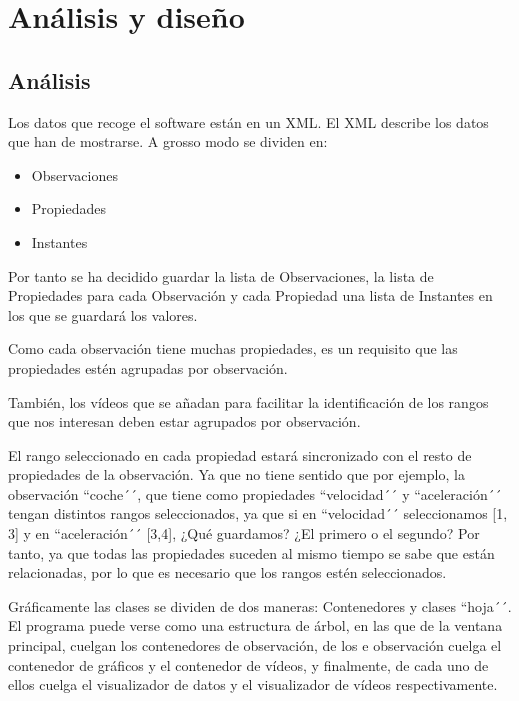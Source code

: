 \chapter{An\'{a}lisis y dise\~{n}o}


\section{An\'{a}lisis}
Los datos que recoge el software est\'an en un XML. El XML describe los datos que han de mostrarse. A grosso modo se dividen en:
\begin{itemize}
	\item Observaciones
	\item Propiedades
	\item Instantes
\end{itemize}

Por tanto se ha decidido guardar la lista de Observaciones, la lista de Propiedades para cada Observaci\'on y cada Propiedad
una lista de Instantes en los que se guardar\'a los valores.

Como cada observaci\'on tiene muchas propiedades, es un requisito que las propiedades est\'en
agrupadas por observaci\'on.

Tambi\'en, los v\'ideos que se a\~nadan para facilitar la identificaci\'on de los rangos que
nos interesan deben estar agrupados por observaci\'on.

El rango seleccionado en cada propiedad estar\'a sincronizado con el resto de propiedades de
la observaci\'on. Ya que no tiene sentido que por ejemplo, la observaci\'on ``coche´´, 
que tiene como propiedades ``velocidad´´ y ``aceleraci\'on´´ tengan distintos rangos 
seleccionados, ya que si en ``velocidad´´ seleccionamos [1, 3] y en ``aceleraci\'on´´ [3,4], 
¿Qu\'e guardamos? ¿El primero o el segundo? Por tanto, ya que todas las propiedades suceden al
mismo tiempo se sabe que est\'an relacionadas, por lo que es necesario que los rangos est\'en
seleccionados.

Gr\'aficamente las clases se dividen de dos maneras: Contenedores y clases ``hoja´´.
El programa puede verse como una estructura de \'arbol, en las que de la ventana principal,
cuelgan los contenedores de observaci\'on, de los e observaci\'on cuelga el contenedor de
gr\'aficos y el contenedor de v\'ideos, y finalmente, de cada uno de ellos cuelga el 
visualizador de datos y el visualizador de v\'ideos respectivamente.

